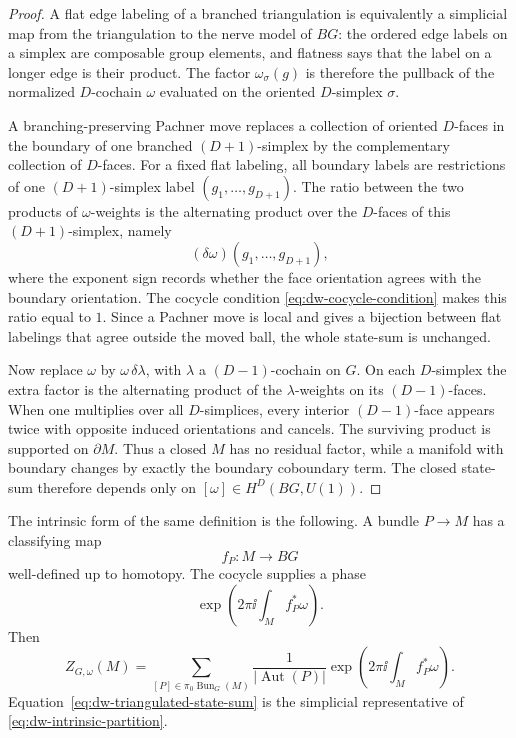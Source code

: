 \begin{proof}
A flat edge labeling of a branched triangulation is equivalently a simplicial
map from the triangulation to the nerve model of \(BG\): the ordered edge
labels on a simplex are composable group elements, and flatness says that
the label on a longer edge is their product.  The factor
\(\omega_\sigma(g)\) is therefore the pullback of the normalized
\(D\)-cochain \(\omega\) evaluated on the oriented \(D\)-simplex \(\sigma\).

A branching-preserving Pachner move replaces a collection of oriented
\(D\)-faces in the boundary of one branched \((D+1)\)-simplex by the
complementary collection of \(D\)-faces.  For a fixed flat labeling, all
boundary labels are restrictions of one \((D+1)\)-simplex label
\((g_1,\ldots,g_{D+1})\).  The ratio between the two products of
\(\omega\)-weights is the alternating product over the \(D\)-faces of this
\((D+1)\)-simplex, namely
\[
  (\delta\omega)(g_1,\ldots,g_{D+1}),
\]
where the exponent sign records whether the face orientation agrees with the
boundary orientation.  The cocycle condition
\eqref{eq:dw-cocycle-condition} makes this ratio equal to \(1\).  Since a
Pachner move is local and gives a bijection between flat labelings that
agree outside the moved ball, the whole state-sum is unchanged.

Now replace \(\omega\) by \(\omega\,\delta\lambda\), with \(\lambda\) a
\((D-1)\)-cochain on \(G\).  On each \(D\)-simplex the extra factor is the
alternating product of the \(\lambda\)-weights on its \((D-1)\)-faces.  When
one multiplies over all \(D\)-simplices, every interior \((D-1)\)-face
appears twice with opposite induced orientations and cancels.  The surviving
product is supported on \(\partial M\).  Thus a closed \(M\) has no residual
factor, while a manifold with boundary changes by exactly the boundary
coboundary term.  The closed state-sum therefore depends only on
\([\omega]\in H^D(BG,U(1))\).
\end{proof}

The intrinsic form of the same definition is the following.  A bundle
\(P\to M\) has a classifying map
\[
  f_P:M\to BG
\]
well-defined up to homotopy.  The cocycle supplies a phase
\[
  \exp\!\left(2\pi\ii\int_M f_P^*\omega\right).
\]
Then
\begin{equation}
  Z_{G,\omega}(M)
  =
  \sum_{[P]\in\pi_0\operatorname{Bun}_G(M)}
  \frac{1}{|\operatorname{Aut}(P)|}
  \exp\!\left(2\pi\ii\int_M f_P^*\omega\right).
  \label{eq:dw-intrinsic-partition}
\end{equation}
Equation~\eqref{eq:dw-triangulated-state-sum} is the simplicial
representative of \eqref{eq:dw-intrinsic-partition}.

